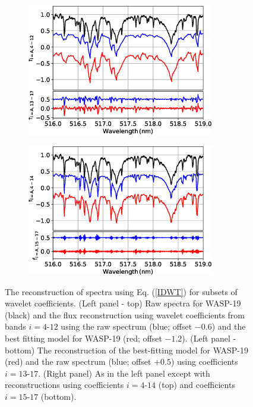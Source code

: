 \begin{figure}
\centering
\begin{subfigure}{.5\textwidth}
  \centering
                \includegraphics[width=0.9\textwidth]{5-images/waveletfilter_bad.eps}
                \caption{}\label{filt:a}
\end{subfigure}%
\begin{subfigure}{.5\textwidth}
  \centering
                \includegraphics[width=0.9\textwidth]{5-images/waveletfilter.eps}
                \caption{}\label{filt:b}
\end{subfigure}
\caption{The reconstruction of spectra using Eq. (\ref{IDWT}) for subsets of wavelet coefficients. (Left panel - top) Raw spectra for WASP-19 (black) and the flux reconstruction using wavelet coefficients from bands $i=4$-$12$ using the raw spectrum (blue; offset $-0.6$) and the best fitting model for WASP-19 (red; offset $-1.2$). (Left panel - bottom) The reconstruction of the best-fitting model for WASP-19 (red) and the raw spectrum (blue; offset $+0.5$) using coefficients $i=13$-$17$. (Right panel) As in the left panel except with reconstructions using coefficients $i=4$-$14$ (top) and coefficients $i=15$-$17$ (bottom).}\label{fig:wavelet:filt}
\end{figure}

